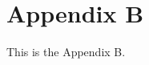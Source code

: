\section{Appendix B}\label{appendix-b}\thispagestyle{SectionFirstPage} %
\setcounter{figure}{0}
\setcounter{table}{0}
This is the Appendix B.
